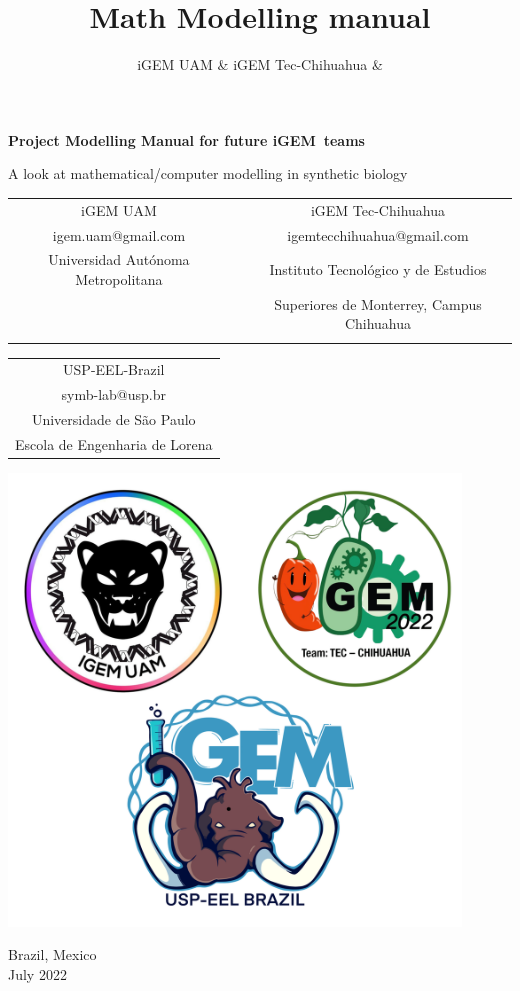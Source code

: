 \documentclass[11pt, letterpaper, english]{article}
\title{Math Modelling manual}
\author{iGEM UAM \&  iGEM Tec-Chihuahua \& }
\begin{document}
\begin{titlepage}
   \begin{center}
       \vspace*{1cm}

   {\Huge \textbf{Project Modelling Manual for future iGEM teams}}

       \vspace{0.5cm}
        A look at mathematical/computer modelling in synthetic biology
            
       \vspace{1.5 cm}

\centering\begin{tabular}{>{\centering\arraybackslash} c c c}
iGEM UAM &  & iGEM Tec-Chihuahua \\
igem.uam@gmail.com &  & igemtecchihuahua@gmail.com\\
Universidad Autónoma Metropolitana &  & Instituto Tecnológico y de Estudios\\
 &  & Superiores de Monterrey, Campus Chihuahua\\
 &  & \\
 \end{tabular}
 \centering\begin{tabular}{>{\centering\arraybackslash} c}
 USP-EEL-Brazil \\
symb-lab@usp.br \\
Universidade de São Paulo \\
Escola de Engenharia de Lorena \\
\end{tabular}




  \vspace{1.0cm}
        
\includegraphics[width=12cm]{Logos-Chih-UAM-USP.png}

       \vfill
       \vspace{0.1cm}
       Brazil, Mexico\\
       July 2022
            
   \end{center}
\end{titlepage}
\end{document}
